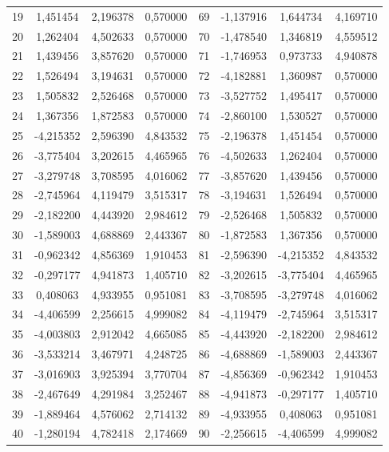 \begin{apendicesenv}
\begin{table}[H]
\begin{tabular}{c c c c c c c c}
19 & 1,451454 & 2,196378 & 0,570000 & 69 & -1,137916 & 1,644734 & 4,169710 \\
20 & 1,262404 & 4,502633 & 0,570000 & 70 & -1,478540 & 1,346819 & 4,559512 \\
21 & 1,439456 & 3,857620 & 0,570000 & 71 & -1,746953 & 0,973733 & 4,940878 \\
22 & 1,526494 & 3,194631 & 0,570000 & 72 & -4,182881 & 1,360987 & 0,570000 \\
23 & 1,505832 & 2,526468 & 0,570000 & 73 & -3,527752 & 1,495417 & 0,570000 \\
24 & 1,367356 & 1,872583 & 0,570000 & 74 & -2,860100 & 1,530527 & 0,570000 \\
25 & -4,215352 & 2,596390 & 4,843532 & 75 & -2,196378 & 1,451454 & 0,570000 \\
26 & -3,775404 & 3,202615 & 4,465965 & 76 & -4,502633 & 1,262404 & 0,570000 \\
27 & -3,279748 & 3,708595 & 4,016062 & 77 & -3,857620 & 1,439456 & 0,570000 \\
28 & -2,745964 & 4,119479 & 3,515317 & 78 & -3,194631 & 1,526494 & 0,570000 \\
29 & -2,182200 & 4,443920 & 2,984612 & 79 & -2,526468 & 1,505832 & 0,570000 \\
30 & -1,589003 & 4,688869 & 2,443367 & 80 & -1,872583 & 1,367356 & 0,570000 \\
31 & -0,962342 & 4,856369 & 1,910453 & 81 & -2,596390 & -4,215352 & 4,843532 \\
32 & -0,297177 & 4,941873 & 1,405710 & 82 & -3,202615 & -3,775404 & 4,465965 \\
33 & 0,408063 & 4,933955 & 0,951081 & 83 & -3,708595 & -3,279748 & 4,016062 \\
34 & -4,406599 & 2,256615 & 4,999082 & 84 & -4,119479 & -2,745964 & 3,515317 \\
35 & -4,003803 & 2,912042 & 4,665085 & 85 & -4,443920 & -2,182200 & 2,984612 \\
36 & -3,533214 & 3,467971 & 4,248725 & 86 & -4,688869 & -1,589003 & 2,443367 \\
37 & -3,016903 & 3,925394 & 3,770704 & 87 & -4,856369 & -0,962342 & 1,910453 \\
38 & -2,467649 & 4,291984 & 3,252467 & 88 & -4,941873 & -0,297177 & 1,405710 \\
39 & -1,889464 & 4,576062 & 2,714132 & 89 & -4,933955 & 0,408063 & 0,951081 \\
40 & -1,280194 & 4,782418 & 2,174669 & 90 & -2,256615 & -4,406599 & 4,999082 \\

\end{tabular}
\end{table}
\end{apendicesenv}
